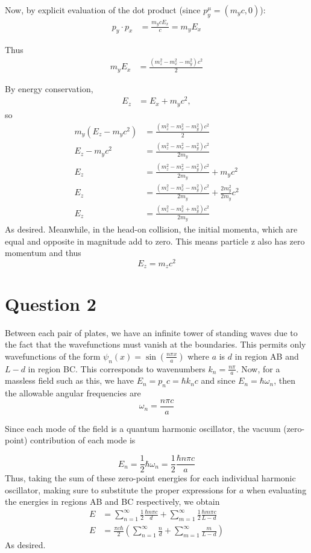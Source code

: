 \documentclass[12pt]{article}
\begin{document}
Now, by explicit evaluation of the dot product (since $p_y^\mu = (m_y c,0)$):
\begin{align}
    p_y \cdot p_x &= \frac{m_ycE_x}{c} = m_y E_x
\end{align}

Thus
\begin{align}
    m_y E_x &= \frac{(m_z^2 - m_x^2 - m_y^2)c^2}{2}
\end{align}

By energy conservation,
\begin{align}
    E_z &= E_x + m_yc^2,
\end{align}
so
\begin{align}
    m_y(E_z - m_yc^2) &= \frac{(m_z^2 - m_x^2 - m_y^2)c^2}{2} \\
    E_z - m_yc^2 &= \frac{(m_z^2 - m_x^2 - m_y^2)c^2}{2m_y} \\ 
    E_z  &= \frac{(m_z^2 - m_x^2 - m_y^2)c^2}{2m_y} + m_yc^2 \\ 
    E_z  &= \frac{(m_z^2 - m_x^2 - m_y^2)c^2}{2m_y} + \frac{2m_y^2}{2m_y}c^2 \\ 
    E_z  &= \frac{(m_z^2 - m_x^2 + m_y^2)c^2}{2m_y}
\end{align}
As desired. Meanwhile, in the head-on collision, the initial momenta, which are 
equal and opposite in magnitude add to zero. This means particle z also has zero 
momentum and thus
$$E_z = m_zc^2$$


\section*{Question 2}
Between each pair of plates, we have an infinite tower of standing waves due to
the fact that the wavefunctions must vanish at the boundaries. This permits
only wavefunctions of the form $\psi_n(x) = \sin\left(\frac{n\pi x}{a}\right)$
where $a$ is $d$ in region AB and $L - d$ in region BC. This corresponds to
wavenumbers $k_n = \frac{n\pi}{a}$. Now, for a massless field such as this, 
we have $E_n = p_nc = \hbar k_n c$ and since $E_n = \hbar \omega_n$, then the
allowable angular frequencies are
$$ \omega_n = \frac{n\pi c}{a}$$

Since each mode of the field is a quantum harmonic oscillator, the vacuum
(zero-point) contribution of each mode is

$$E_n=\frac{1}{2}\hbar \omega_n = \frac{1}{2}\frac{\hbar n \pi c}{a}$$
Thus, taking the sum of these zero-point energies for each individual harmonic
oscillator, making sure to substitute the proper expressions for $a$ when 
evaluating the energies in regions AB and BC respectively, we obtain
\begin{align}
    E &= \sum_{n=1}^\infty \frac{1}{2}\frac{\hbar n \pi c}{d}
+ \sum_{m=1}^\infty \frac{1}{2}\frac{\hbar m \pi c}{L - d} \\
   E &= \frac{\pi c \hbar}{2} \left(\sum_{n=1}^\infty \frac{n}{d}
       + \sum_{m=1}^\infty \frac{m}{L-d}\right)
\end{align}
As desired.
\end{document}
